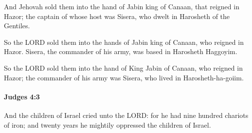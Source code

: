 			\begin{versebox}
					\item[BHS] 
					\item[ASV] And Jehovah sold them into the hand of Jabin king of Canaan, that reigned in Hazor; the captain of whose host was Sisera, who dwelt in Harosheth of the Gentiles.
					\item[NIV] So the LORD sold them into the hands of Jabin king of Canaan, who reigned in Hazor. Sisera, the commander of his army, was based in Harosheth Haggoyim.
					\item[NRSV] So the LORD sold them into the hand of King Jabin of Canaan, who reigned in Hazor; the commander of his army was Sisera, who lived in Harosheth-ha-goiim.
			\end{versebox}

		\paragraph{Judges 4:3} %
			\label{JUDGES-4-3}

			And the children of Israel cried unto the LORD: for he had nine hundred chariots of iron; and twenty years he mightily oppressed the children of Israel.

